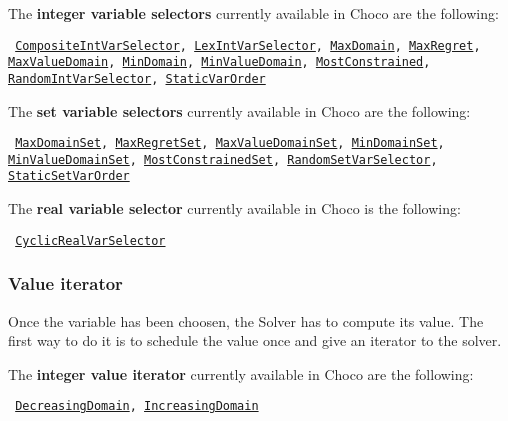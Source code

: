 \noindent The \textbf{integer variable selectors} currently available in Choco are the following: 
\begin{notedef}\tt
\hyperlink{compositeintvarselector:compositeintvarselectorvarselector}{CompositeIntVarSelector}, \hyperlink{lexintvarselector:lexintvarselectorvarselector}{LexIntVarSelector}, \hyperlink{maxdomain:maxdomainvarselector}{MaxDomain}, \hyperlink{maxregret:maxregretvarselector}{MaxRegret}, \hyperlink{maxvaldomain:maxvaldomainvarselector}{MaxValueDomain}, \hyperlink{mindomain:mindomainvarselector}{MinDomain}, \hyperlink{minvaldomain:minvaldomainvarselector}{MinValueDomain}, \hyperlink{mostconstrained:mostconstrainedvarselector}{MostConstrained},  \hyperlink{randomvarint:randomvarintvarselector}{RandomIntVarSelector},  \hyperlink{staticvarorder:staticvarordervarselector}{StaticVarOrder}
\end{notedef}

\noindent The \textbf{set variable selectors} currently available in Choco are the following: 
\begin{notedef}\tt
\hyperlink{maxdomset:maxdomsetvarselector}{MaxDomainSet}, \hyperlink{maxregretset:maxregretsetvarselector}{MaxRegretSet}, \hyperlink{maxvaldomainset:maxvaldomainsetvarselector}{MaxValueDomainSet}, \hyperlink{mindomset:mindomsetvarselector}{MinDomainSet}, \hyperlink{minvaldomainset:minvaldomainsetvarselector}{MinValueDomainSet}, \hyperlink{mostconstrainedset:mostconstrainedsetvarselector}{MostConstrainedSet},  \hyperlink{randomvarset:randomvarsetvarselector}{RandomSetVarSelector},  \hyperlink{staticsetvarorder:staticsetvarordervarselector}{StaticSetVarOrder}
\end{notedef}

\noindent The \textbf{real variable selector} currently available in Choco is the following: 
\begin{notedef}\tt
\hyperlink{cyclicrealvarselector:cyclicrealvarselectorvarselector}{CyclicRealVarSelector}
\end{notedef}

\subsubsection{Value iterator}\label{solver:valueiterator}\hypertarget{solver:valueiterator}{}
Once the variable has been choosen, the Solver has to compute its value. The first way to do it is to schedule the value once and give an iterator to the solver.

\noindent The \textbf{integer value iterator} currently available in Choco are the following: 
\begin{notedef}\tt
\hyperlink{decreasingdomain:decreasingdomainvaliterator}{DecreasingDomain}, \hyperlink{increasingdomain:increasingdomainvaliterator}{IncreasingDomain}
\end{notedef}

